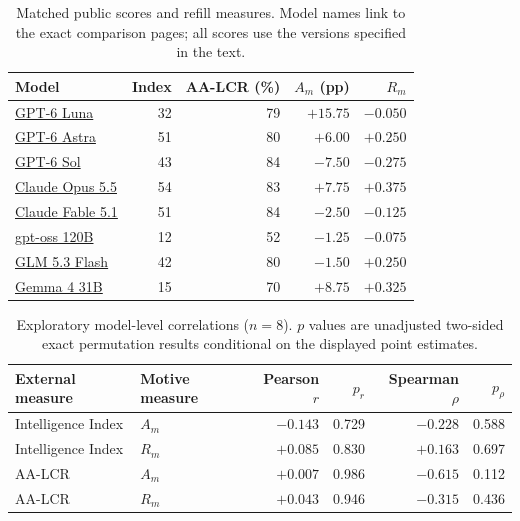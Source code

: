 \begin{table}[!t]
\centering\footnotesize
\caption{Matched public scores and refill measures. Model names link to the exact comparison pages; all scores use the versions specified in the text.}
\label{tab:capability-inputs}
\begin{tabular}{@{}lrrrr@{}}
\toprule
Model & Index & AA-LCR (\%) & $A_m$ (pp) & $R_m$ \\
\midrule
\href{https://artificialanalysis.ai/models/comparisons/gpt-6-luna-high-vs-gpt-6-sol-high}{GPT-6 Luna} & 32 & 79 & $+15.75$ & $-0.050$ \\
\href{https://artificialanalysis.ai/models/comparisons/gpt-6-astra-high-vs-gpt-oss-120b}{GPT-6 Astra} & 51 & 80 & $+6.00$ & $+0.250$ \\
\href{https://artificialanalysis.ai/models/comparisons/gpt-6-luna-high-vs-gpt-6-sol-high}{GPT-6 Sol} & 43 & 84 & $-7.50$ & $-0.275$ \\
\href{https://artificialanalysis.ai/models/comparisons/claude-opus-5-5-high-vs-gpt-oss-120b}{Claude Opus 5.5} & 54 & 83 & $+7.75$ & $+0.375$ \\
\href{https://artificialanalysis.ai/models/comparisons/claude-fable-5-1-high-vs-gpt-oss-120b}{Claude Fable 5.1} & 51 & 84 & $-2.50$ & $-0.125$ \\
\href{https://artificialanalysis.ai/models/comparisons/gemma-4-31b-vs-gpt-oss-120b}{gpt-oss 120B} & 12 & 52 & $-1.25$ & $-0.075$ \\
\href{https://artificialanalysis.ai/models/comparisons/glm-5-3-flash-vs-gpt-oss-120b}{GLM 5.3 Flash} & 42 & 80 & $-1.50$ & $+0.250$ \\
\href{https://artificialanalysis.ai/models/comparisons/gemma-4-31b-vs-gpt-oss-120b}{Gemma 4 31B} & 15 & 70 & $+8.75$ & $+0.325$ \\
\bottomrule
\end{tabular}
\end{table}

\begin{table}[!t]
\centering\footnotesize
\caption{Exploratory model-level correlations ($n=8$). $p$ values are unadjusted two-sided exact permutation results conditional on the displayed point estimates.}
\label{tab:capability-correlations}
\begin{tabular}{@{}llrrrr@{}}
\toprule
External measure & Motive measure & Pearson $r$ & $p_r$ & Spearman $\rho$ & $p_\rho$ \\
\midrule
Intelligence Index & $A_m$ & $-0.143$ & 0.729 & $-0.228$ & 0.588 \\
Intelligence Index & $R_m$ & $+0.085$ & 0.830 & $+0.163$ & 0.697 \\
AA-LCR & $A_m$ & $+0.007$ & 0.986 & $-0.615$ & 0.112 \\
AA-LCR & $R_m$ & $+0.043$ & 0.946 & $-0.315$ & 0.436 \\
\bottomrule
\end{tabular}
\end{table}

